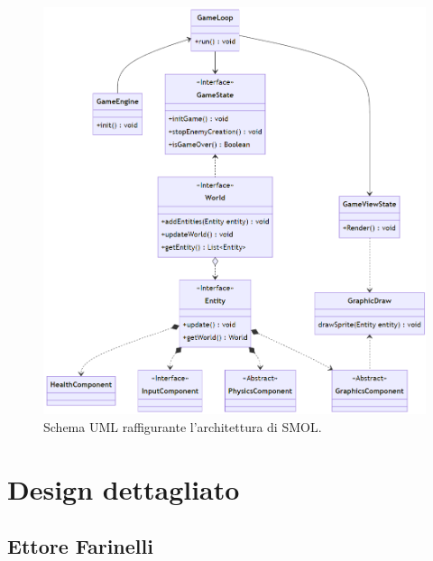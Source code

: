 \documentclass[a4paper,12pt]{report}
\begin{document}
\begin{figure}[h]
\centering{}
\includegraphics[width=\textwidth]{img/ArchitecturalUML.png}
\caption{Schema UML raffigurante l'architettura di SMOL.}
\label{img:ArchitecturalUML}
\end{figure}

\section{Design dettagliato}

\subsection*{Ettore Farinelli}
\end{document}
